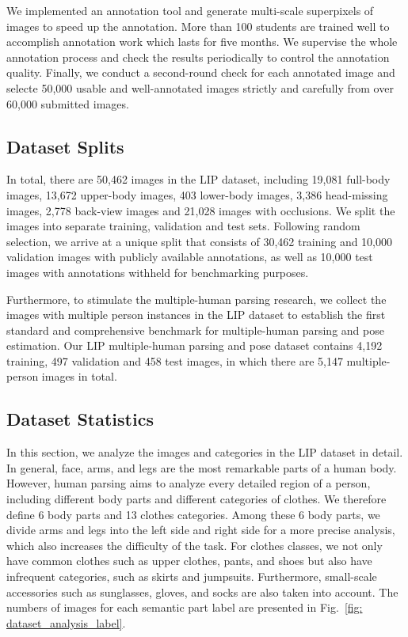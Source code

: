 \documentclass[10pt,journal,compsoc]{IEEEtran}
\begin{document}
{We implemented an annotation tool and generate multi-scale superpixels of images to speed up the annotation. More than 100 students are trained well to accomplish annotation work which lasts for five months. We supervise the whole annotation process and check the results periodically to control the annotation quality. Finally, we conduct a second-round check for each annotated image and selecte 50,000 usable and well-annotated images strictly and carefully from over 60,000 submitted images. }


\subsection{Dataset Splits}
In total, there are 50,462 images in the LIP dataset, including 19,081 full-body images, 13,672 upper-body images, 403 lower-body images, 3,386 head-missing images, 2,778 back-view images and 21,028 images with occlusions. We split the images into separate training, validation and test sets. Following random selection, we arrive at a unique split that consists of 30,462 training and 10,000 validation images with publicly available annotations, as well as 10,000 test images with annotations withheld for benchmarking purposes.

Furthermore, to stimulate the multiple-human parsing research, we collect the images with multiple person instances in the LIP dataset to establish the first standard and comprehensive benchmark for multiple-human parsing and pose estimation. Our LIP multiple-human parsing and pose dataset contains 4,192 training, 497 validation and 458 test images, in which there are 5,147 multiple-person images in total.
\subsection{Dataset Statistics}
In this section, we analyze the images and categories in the LIP dataset in detail. In general, face, arms, and legs are the most remarkable parts of a human body. However, human parsing aims to analyze every detailed region of a person, including different body parts and different categories of clothes. We therefore define 6 body parts and 13 clothes categories. Among these 6 body parts, we divide arms and legs into the left side and right side for a more precise analysis, which also increases the difficulty of the task. For clothes classes, we  not only have common clothes such as upper clothes, pants, and shoes but also have infrequent categories, such as skirts and jumpsuits. Furthermore, small-scale accessories such as sunglasses, gloves, and socks are also taken into account. The numbers of images for each semantic part label are presented in Fig.~\ref{fig: dataset_analysis_label}.
\end{document}
